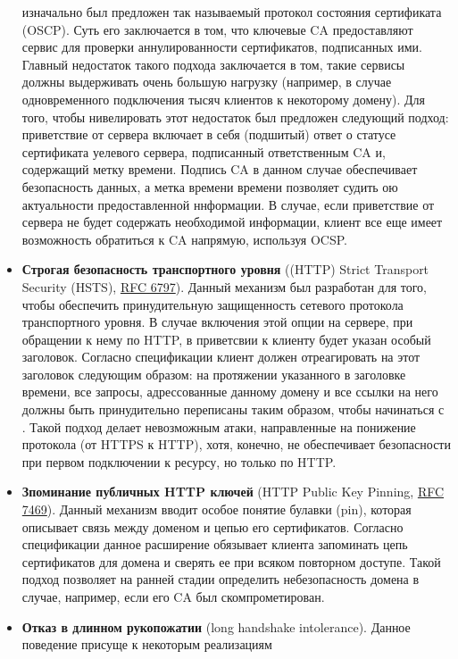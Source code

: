\begin{itemize}
        изначально был предложен так называемый протокол состояния сертификата (OSCP). Суть его заключается в том, что ключевые
        CA предоставляют сервис для проверки аннулированности сертификатов, подписанных ими. Главный недостаток такого подхода 
        заключается в том, такие сервисы должны выдерживать очень большую нагрузку (например, в случае одновременного подключения
        тысяч клиентов к некоторому домену). Для того, чтобы нивелировать этот недостаток был предложен следующий подход: приветствие
        от сервера  включает в себя (подшитый) ответ о статусе сертификата уелевого сервера, подписанный ответственным CA и, 
        содержащий метку времени. Подпись CA в данном случае обеспечивает безопасность данных, а метка времени времени позволяет
        судить ою актуальности предоставленной ннформации. В случае, если приветствие от сервера не будет содержать необходимой 
        информации, клиент все еще имеет возможность обратиться к CA напрямую, используя OCSP.
    \item \textbf{Строгая безопасность транспортного уровня} ((HTTP) Strict Transport Security (HSTS), 
        \href{https://tools.ietf.org/html/rfc6797}{RFC 6797}). Данный механизм был разработан для того, чтобы обеспечить 
        принудительную защищенность сетевого протокола транспортного уровня. В случае включения этой опции на сервере, при 
        обращении к нему по HTTP, в приветсвии к клиенту будет указан особый заголовок. Согласно спецификации клиент должен 
        отреагировать на этот заголовок следующим образом: на протяжении указанного в заголовке времени, все запросы, адрессованные
        данному домену и все ссылки на него должны быть принудительно переписаны таким образом, чтобы начинаться с .
        Такой подход делает невозможным атаки, направленные на понижение протокола (от HTTPS к HTTP), хотя, конечно, не обеспечивает
        безопасности при первом подключении к ресурсу, но только по HTTP.
    \item \textbf{Зпоминание публичных HTTP ключей} (HTTP Public Key Pinning, \href{https://tools.ietf.org/html/rfc7469}{RFC 7469}).
        Данный механизм вводит особое понятие булавки (pin), которая описывает связь между доменом и цепью его сертификатов. 
        Согласно спецификации данное расширение обязывает клиента запоминать цепь сертификатов для домена и сверять ее при всяком
        повторном доступе. Такой подход позволяет на ранней стадии определить небезопасность домена в случае, например, если его CA 
        был скомпрометирован.
    \item \textbf{Отказ в длинном рукопожатии} (long handshake intolerance). Данное поведение присуще к некоторым реализациям 

\end{itemize}
